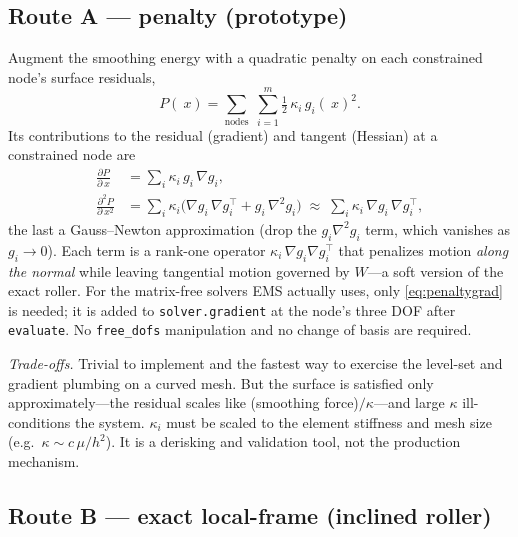 \documentclass[11pt]{article}
\newcommand{\grad}{\nabla}
\newcommand{\code}[1]{\texttt{#1}}
\begin{document}
\subsection{Route A --- penalty (prototype)}
\label{sec:penalty}

Augment the smoothing energy with a quadratic penalty on each constrained
node's surface residuals,
\begin{equation}
  P(~x) = \sum_{\text{nodes}} \; \sum_{i=1}^{m}
          \tfrac12\,\kappa_i\, g_i(~x)^2 .
  \label{eq:penalty}
\end{equation}
Its contributions to the residual (gradient) and tangent (Hessian) at a
constrained node are
\begin{align}
  \frac{\partial P}{\partial ~x}
    &= \sum_i \kappa_i\, g_i\, \grad g_i,
    \label{eq:penaltygrad}\\
  \frac{\partial^2 P}{\partial ~x^2}
    &= \sum_i \kappa_i\bigl(\grad g_i\,\grad g_i^{\top}
       + g_i\,\grad^2 g_i\bigr)
     \;\approx\; \sum_i \kappa_i\,\grad g_i\,\grad g_i^{\top},
    \label{eq:penaltyhess}
\end{align}
the last a Gauss--Newton approximation (drop the $g_i\grad^2 g_i$ term, which
vanishes as $g_i\to0$). Each term is a rank-one operator
$\kappa_i\,\grad g_i\grad g_i^{\top}$ that penalizes motion \emph{along the
normal} while leaving tangential motion governed by $W$---a soft version of the
exact roller. For the matrix-free solvers EMS actually uses, only
\eqref{eq:penaltygrad} is needed; it is added to \code{solver.gradient} at the
node's three DOF after \code{evaluate}. No \code{free\_dofs} manipulation and no
change of basis are required.

\emph{Trade-offs.} Trivial to implement and the fastest way to exercise the
level-set and gradient plumbing on a curved mesh. But the surface is satisfied
only approximately---the residual scales like (smoothing force)$/\kappa$---and
large $\kappa$ ill-conditions the system. $\kappa_i$ must be scaled to the
element stiffness and mesh size (e.g.\ $\kappa \sim c\,\mu/h^2$). It is a
derisking and validation tool, not the production mechanism.

\subsection{Route B --- exact local-frame (inclined roller)}
\label{sec:exact}
\end{document}
